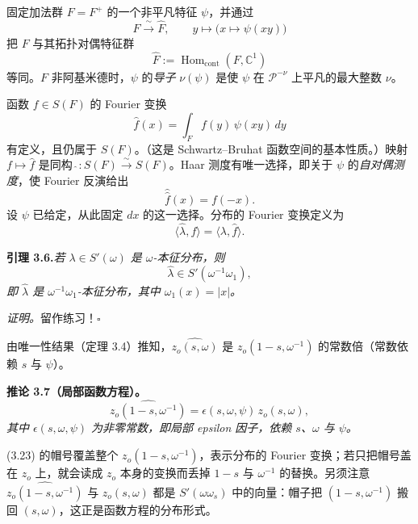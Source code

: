 固定加法群 $F=F^+$ 的一个非平凡特征 $\psi$，并通过
\[
F\xrightarrow{\ \sim\ }\widehat F,\qquad y\mapsto\bigl(x\mapsto\psi(xy)\bigr)
\]
把 $F$ 与其拓扑对偶特征群
\[
\widehat F:=\operatorname{Hom}_{\mathrm{cont}}(F,\mathbb C^1)
\]
等同。$F$ 非阿基米德时，$\psi$ 的\emph{导子} $\nu(\psi)$ 是使 $\psi$ 在 $\mathcal P^{-\nu}$ 上平凡的最大整数 $\nu$。

函数 $f\in S(F)$ 的 Fourier 变换
\[
\hat f(x)=\int_F f(y)\,\psi(xy)\,dy
\]
有定义，且仍属于 $S(F)$。（这是 Schwartz--Bruhat 函数空间的基本性质。）映射 $f\mapsto\hat f$ 是同构 $\widehat{\ }:S(F)\xrightarrow{\sim}S(F)$。Haar 测度有唯一选择，即关于 $\psi$ 的\emph{自对偶测度}，使 Fourier 反演给出
\[
\widehat{\hat f}(x)=f(-x).
\]
设 $\psi$ 已给定，从此固定 $dx$ 的这一选择。分布的 Fourier 变换定义为
\[
\langle\hat\lambda,f\rangle=\langle\lambda,\hat f\rangle.
\]

\medskip\noindent\textbf{引理 3.6.}\quad \emph{若 $\lambda\in S'(\omega)$ 是 $\omega$-本征分布，则}
\[
\hat\lambda\in S'(\omega^{-1}\omega_1),
\]
\emph{即 $\hat\lambda$ 是 $\omega^{-1}\omega_1$-本征分布，其中 $\omega_1(x)=|x|$。}

\emph{证明。}\quad 留作练习！\hfill$\square$

由唯一性结果（定理 3.4）推知，$\widehat{z_o(s,\omega)}$ 是 $z_o(1-s,\omega^{-1})$ 的常数倍（常数依赖 $s$ 与 $\psi$）。

\medskip\noindent\textbf{推论 3.7（局部函数方程）。}\quad
\begin{equation*}\tag{3.23}
\widehat{z_o(1-s,\omega^{-1})}=\epsilon(s,\omega,\psi)\,z_o(s,\omega),
\end{equation*}
\emph{其中 $\epsilon(s,\omega,\psi)$ 为非零常数，即局部 epsilon 因子，依赖 $s$、$\omega$ 与 $\psi$。}

\begin{annote}
(3.23) 的帽号覆盖整个 $z_o(1-s,\omega^{-1})$，表示分布的 Fourier 变换；若只把帽号盖在 $z_o$ 上，就会读成 \(z_o\) 本身的变换而丢掉 $1-s$ 与 $\omega^{-1}$ 的替换。另须注意 $\widehat{z_o(1-s,\omega^{-1})}$ 与 $z_o(s,\omega)$ 都是 $S'(\omega\omega_s)$ 中的向量：帽子把 $(1-s,\omega^{-1})$ 搬回 $(s,\omega)$，这正是函数方程的分布形式。
\par\vspace{0.15em}{\raggedleft 【来源：Tate 论文 §4；Weil《Bourbaki 报告》(1966)（A）】\par}
\end{annote}

